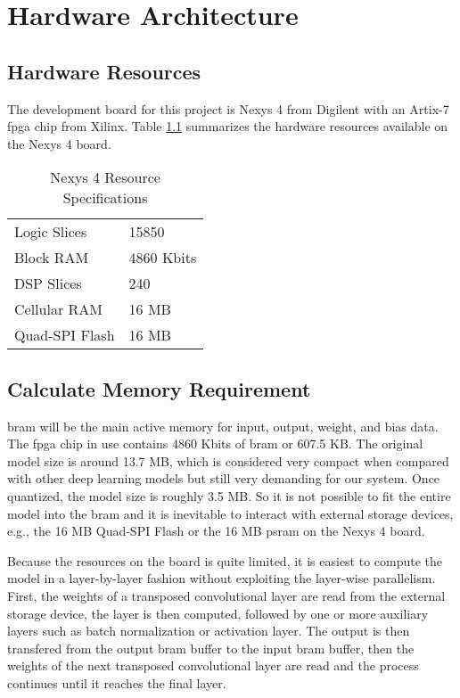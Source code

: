 
\chapter{Hardware Architecture}

\section{Hardware Resources}

The development board for this project is Nexys 4 from Digilent with an Artix-7 \gls{fpga} chip from Xilinx.
Table \ref{table:hardware_resources} summarizes the hardware resources available on the Nexys 4 board.

\begin{table}[h]
  \centering
  \caption{Nexys 4 Resource Specifications}
  \begin{tabular}{l | l}
    Logic Slices & 15850 \\
    Block RAM & 4860 Kbits \\
    DSP Slices & 240 \\
    Cellular RAM & 16 MB \\
    Quad-SPI Flash & 16 MB
  \end{tabular}
  \label{table:hardware_resources}
\end{table}

\section{Calculate Memory Requirement}

\gls{bram} will be the main active memory for input, output, weight, and bias data. The \gls{fpga} chip in use
contains 4860 Kbits of \gls{bram} or 607.5 KB. The original model size is around 13.7 MB, which is
considered very compact when compared with other deep learning models but still very demanding for
our system. Once quantized, the model size is roughly 3.5 MB. So it is not possible to fit the entire model
into the \gls{bram} and it is inevitable to interact with external storage devices, e.g., the 16 MB Quad-SPI
Flash or the 16 MB \gls{psram} on the Nexys 4 board.

Because the resources on the board is quite limited, it is easiest to compute the model in a layer-by-layer
fashion without exploiting the layer-wise parallelism. First, the weights of a transposed
convolutional layer are read from the external storage device, the layer is then computed, followed by one or
more auxiliary layers such as batch normalization or activation layer. The output is then transfered from
the output \gls{bram} buffer to the input \gls{bram} buffer, then the weights of the next transposed
convolutional layer are read and the process continues until it reaches the final layer.

